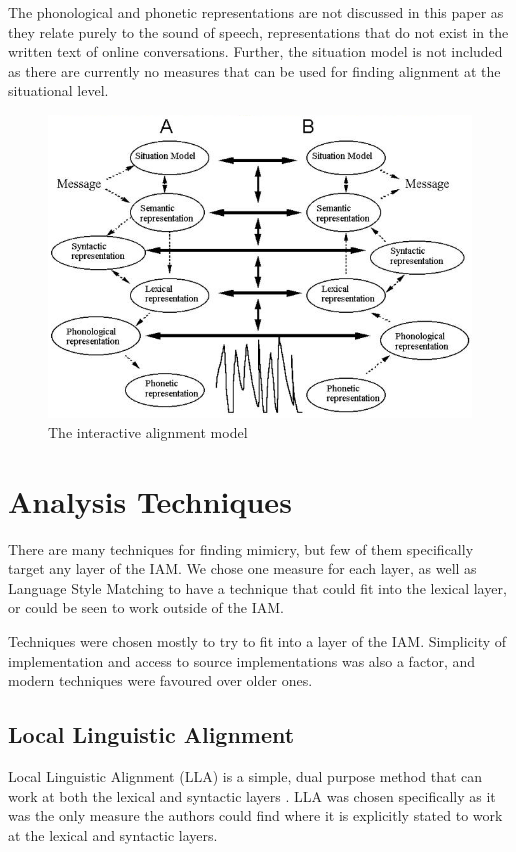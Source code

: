 \documentclass[conference]{IEEEtran}
\begin{document}
The phonological and phonetic representations are not discussed in this paper as they relate purely to the sound of speech, representations that do not exist in the written text of online conversations. Further, the situation model is not included as there are currently no measures that can be used for finding alignment at the situational level.

\begin{figure}
\caption{The interactive alignment model}
\label{iam}
\includegraphics[width=\textwidth]{iam}
\end{figure}


\section{Analysis Techniques}

There are many techniques for finding mimicry, but few of them specifically target any layer of the IAM. We chose one measure for each layer, as well as Language Style Matching to have a technique that could fit into the lexical layer, or could be seen to work outside of the IAM.

Techniques were chosen mostly to try to fit into a layer of the IAM. Simplicity of implementation and access to source implementations was also a factor, and modern techniques were favoured over older ones.


\subsection{Local Linguistic Alignment}
Local Linguistic Alignment (LLA) is a simple, dual purpose method that can work at both the lexical and syntactic layers \cite{wang2014linguistic, xu2015evaluation}. LLA was chosen specifically as it was the only measure the authors could find where it is explicitly stated to work at the lexical and syntactic layers.
\end{document}
